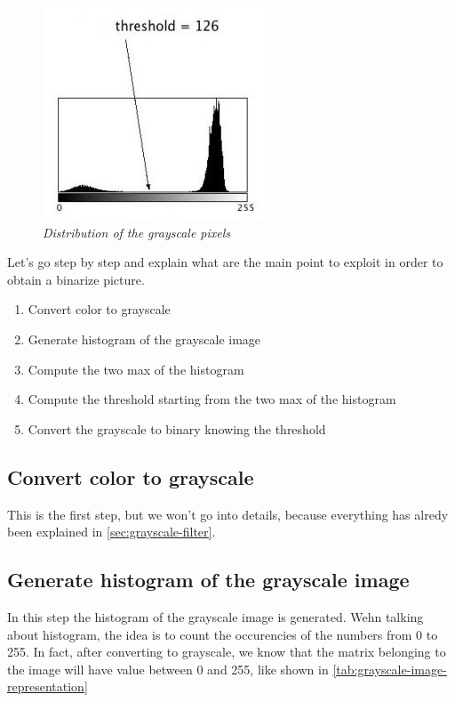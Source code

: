 \documentclass[paper=a4, fontsize=10pt]{scrartcl}	%
\begin{document}
	\begin{figure}[H]
		\centering
		\includegraphics[width=0.45\linewidth]{images/binarization/histogram.jpeg}
		\caption{\textit{Distribution of the grayscale pixels}}
		\label{fig:grayscale-pixels-distribution}
	\end{figure}

	Let's go step by step and explain what are the main point to exploit in order to obtain a binarize picture. 

	\begin{enumerate}
		\item Convert color to grayscale
		\item Generate histogram of the grayscale image
		\item Compute the two max of the histogram
		\item Compute the threshold starting from the two max of the histogram
		\item Convert the grayscale to binary knowing the threshold
	\end{enumerate}

	\subsection{Convert color to grayscale}

	This is the first step, but we won't go into details, because everything has alredy been explained in \autoref{sec:grayscale-filter}.

	\subsection{Generate histogram of the grayscale image}

	In this step the histogram of the grayscale image is generated. Wehn talking about histogram, the idea is to count the occurencies of the numbers from 0 to 255. In fact, after converting to grayscale, we know that the matrix belonging to the image will have value between 0 and 255, like shown in \autoref{tab:grayscale-image-representation}
\end{document}
